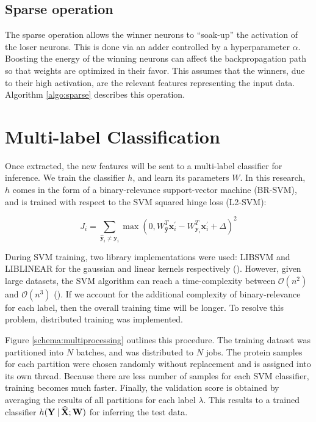 

\subsection{Sparse operation}

\par The sparse operation allows the winner neurons to ``soak-up'' the
activation of the loser neurons. This is done via an adder controlled by
a hyperparameter $\alpha$. Boosting the energy of the winning neurons can
affect the backpropagation path so that weights are optimized in their favor.
This assumes that the winners, due to their high activation, are the
relevant features representing the input data. Algorithm \ref{algo:sparse}
describes this operation.



\section{Multi-label Classification}
\label{MultiLabelClassification}

\par Once extracted, the new features will be sent to a multi-label classifier for
inference. We train the classifier $h$, and learn its parameters $W$. In this
research, $h$ comes in the form of a binary-relevance support-vector machine
(BR-SVM), and is trained with respect to the SVM squared hinge loss (L2-SVM): 

\begin{equation}
J_i = \sum_{\widehat{\mathbf{y}}_i \neq \mathbf{y}_i}\max(0, W_{\widehat{\mathbf{y}}}^{T} \mathbf{x}_{i}^{'} - W_{\mathbf{y}_i}^{T}\mathbf{x}_{i}^{'} + \Delta)^{2}
\end{equation}

\par During SVM training, two library implementations were used: LIBSVM and
LIBLINEAR for the gaussian and linear kernels respectively
(\cite{chang2011libsvm, fan2008liblinear}). However, given large datasets, the
SVM algorithm can reach a time-complexity between $\mathcal{O}(n^{2})$ and
$\mathcal{O}(n^{3})$ (\cite{bottou2006support}). If we account for the
additional complexity of binary-relevance for each label, then the overall
training time will be longer. To resolve this problem, distributed training was
implemented.

\par Figure \ref{schema:multiprocessing} outlines this procedure. The training
dataset was partitioned into $N$ batches, and was distributed to $N$ jobs. The
protein samples for each partition were chosen randomly without replacement and
is assigned into its own thread. Because there are less number of samples for
each SVM classifier, training becomes much faster. Finally, the validation score
is obtained by averaging the results of all partitions for each label
$\lambda$. This results to a trained classifier $h(\mathbf{Y} \:\vert\:
\mathbf{\widehat{X}}; \mathbf{W})$ for inferring the test data.

